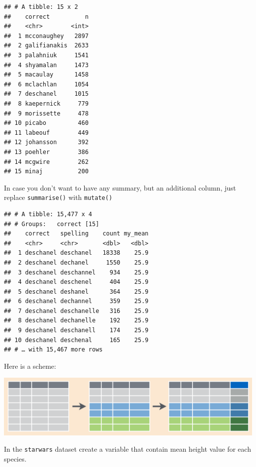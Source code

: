 \documentclass[
]{book}
\makeatletter
\newenvironment{Shaded}{\begin{snugshade}}{\end{snugshade}}
\newcommand{\DataTypeTok}[1]{\textcolor[rgb]{0.13,0.29,0.53}{#1}}
\newcommand{\KeywordTok}[1]{\textcolor[rgb]{0.13,0.29,0.53}{\textbf{#1}}}
\newcommand{\NormalTok}[1]{#1}
\newcommand{\OperatorTok}[1]{\textcolor[rgb]{0.81,0.36,0.00}{\textbf{#1}}}
\newcommand{\StringTok}[1]{\textcolor[rgb]{0.31,0.60,0.02}{#1}}
\newenvironment{kframe}{%
\medskip{}
\setlength{\fboxsep}{.8em}
 \def\at@end@of@kframe{}%
 \ifinner\ifhmode%
  \def\at@end@of@kframe{\end{minipage}}%
  \begin{minipage}{\columnwidth}%
 \fi\fi%
 \def\FrameCommand##1{\hskip\@totalleftmargin \hskip-\fboxsep
 \colorbox{shadecolor}{##1}\hskip-\fboxsep
     \hskip-\linewidth \hskip-\@totalleftmargin \hskip\columnwidth}%
 \MakeFramed {\advance\hsize-\width
   \@totalleftmargin\z@ \linewidth\hsize
   \@setminipage}}%
 {\par\unskip\endMakeFramed%
 \at@end@of@kframe}
\newenvironment{rmdblock}[1]
  {
  \begin{itemize}
  \renewcommand{\labelitemi}{
    \raisebox{-.7\height}[0pt][0pt]{
      {\setkeys{Gin}{width=3em,keepaspectratio}\texttt{[image: images/\#1]}}
    }
  }
  \setlength{\fboxsep}{1em}
  \begin{kframe}
  \item
  }
  {
  \end{kframe}
  \end{itemize}
  }
\newenvironment{rmdtask}
  {\begin{rmdblock}{task}}
  {\end{rmdblock}}
\makeatother
\begin{document}
\begin{verbatim}
## # A tibble: 15 x 2
##    correct          n
##    <chr>        <int>
##  1 mcconaughey   2897
##  2 galifianakis  2633
##  3 palahniuk     1541
##  4 shyamalan     1473
##  5 macaulay      1458
##  6 mclachlan     1054
##  7 deschanel     1015
##  8 kaepernick     779
##  9 morissette     478
## 10 picabo         460
## 11 labeouf        449
## 12 johansson      392
## 13 poehler        386
## 14 mcgwire        262
## 15 minaj          200
\end{verbatim}

In case you don't want to have any summary, but an additional column, just replace \texttt{summarise()} with \texttt{mutate()}

\begin{Shaded}
\end{Shaded}

\begin{verbatim}
## # A tibble: 15,477 x 4
## # Groups:   correct [15]
##    correct   spelling    count my_mean
##    <chr>     <chr>       <dbl>   <dbl>
##  1 deschanel deschanel   18338    25.9
##  2 deschanel dechanel     1550    25.9
##  3 deschanel deschannel    934    25.9
##  4 deschanel deschenel     404    25.9
##  5 deschanel deshanel      364    25.9
##  6 deschanel dechannel     359    25.9
##  7 deschanel deschanelle   316    25.9
##  8 deschanel dechanelle    192    25.9
##  9 deschanel deschanell    174    25.9
## 10 deschanel deschenal     165    25.9
## # … with 15,467 more rows
\end{verbatim}

Here is a scheme:

\includegraphics{images/02.06.group_by_m.png}

\begin{rmdtask}
In the \texttt{starwars} dataset create a variable that contain mean
height value for each species.
\end{rmdtask}
\end{document}
